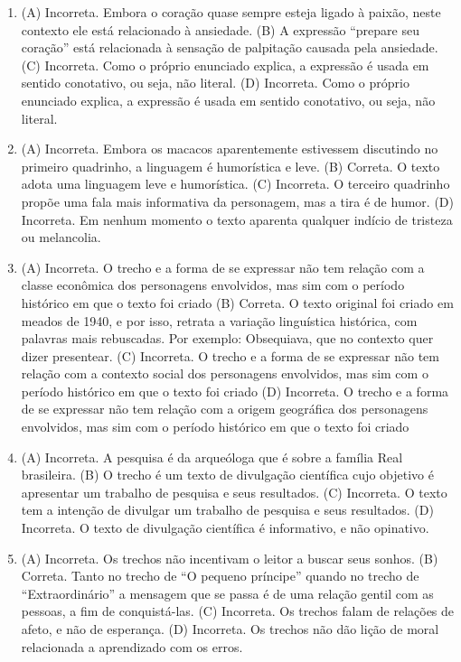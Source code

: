 \begin{enumerate}
\item (A) Incorreta. Embora o coração quase sempre esteja ligado à paixão,
neste contexto ele está relacionado à ansiedade.
(B) A expressão ``prepare seu coração'' está relacionada à sensação de
palpitação causada pela ansiedade.
(C) Incorreta. Como o próprio enunciado explica, a expressão é usada em
sentido conotativo, ou seja, não literal.
(D) Incorreta. Como o próprio enunciado explica, a expressão é usada em
sentido conotativo, ou seja, não literal.

\item (A) Incorreta. Embora os macacos aparentemente estivessem discutindo no
primeiro quadrinho, a linguagem é humorística e leve.
(B) Correta. O texto adota uma linguagem leve e humorística.
(C) Incorreta. O terceiro quadrinho propõe uma fala mais informativa da
personagem, mas a tira é de humor.
(D) Incorreta. Em nenhum momento o texto aparenta qualquer indício de
tristeza ou melancolia.

\item (A) Incorreta. O trecho e a forma de se expressar não tem relação com a
classe econômica dos personagens envolvidos, mas sim com o período
histórico em que o texto foi criado
(B) Correta. O texto original foi criado em meados de 1940, e por isso,
retrata a variação linguística histórica, com palavras mais rebuscadas.
Por exemplo: Obsequiava, que no contexto quer dizer presentear.
(C) Incorreta. O trecho e a forma de se expressar não tem relação com a
contexto social dos personagens envolvidos, mas sim com o período
histórico em que o texto foi criado
(D) Incorreta. O trecho e a forma de se expressar não tem relação com a
origem geográfica dos personagens envolvidos, mas sim com o período
histórico em que o texto foi criado

\item (A) Incorreta. A pesquisa é da arqueóloga que é sobre a família Real
brasileira.
(B) O trecho é um texto de divulgação científica cujo objetivo é
apresentar um trabalho de pesquisa e seus resultados.
(C) Incorreta. O texto tem a intenção de divulgar um trabalho de pesquisa
e seus resultados.
(D) Incorreta. O texto de divulgação científica é informativo, e não
opinativo.

\item (A) Incorreta. Os trechos não incentivam o leitor a buscar seus sonhos.
(B) Correta. Tanto no trecho de ``O pequeno príncipe'' quando no trecho
de ``Extraordinário'' a mensagem que se passa é de uma relação gentil
com as pessoas, a fim de conquistá-las.
(C) Incorreta. Os trechos falam de relações de afeto, e não de esperança.
(D) Incorreta. Os trechos não dão lição de moral relacionada a
aprendizado com os erros.


\end{enumerate}
